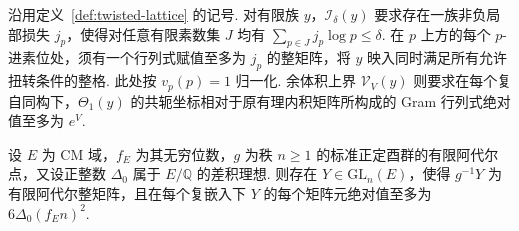 沿用定义~\ref{def:twisted-lattice} 的记号. 对有限族 $y$，$\mathcal I_\delta(y)$ 要求存在一族非负局部损失 $j_p$，使得对任意有限素数集 $J$ 均有 $\sum_{p\in J}j_p\log p\le\delta$. 在 $p$ 上方的每个 $p$-进素位处，须有一个行列式赋值至多为 $j_p$ 的整矩阵，将 $y$ 映入同时满足所有允许扭转条件的整格. 此处按 $v_p(p)=1$ 归一化. 余体积上界 $\mathcal V_V(y)$ 则要求在每个复自同构下，$\Theta_1(y)$ 的共轭坐标相对于原有理内积矩阵所构成的 Gram 行列式绝对值至多为 $e^V$.

\begin{lemma}[正定酉格中的短基]
\label{lem:a-unitary-lattice-basis}
\emitthmsource
设 $E$ 为 CM 域，$f_E$ 为其无穷位数，$g$ 为秩 $n\ge1$ 的标准正定酉群的有限阿代尔点，又设正整数 $\Delta_0$ 属于 $E/\mathbb Q$ 的差积理想. 则存在 $Y\in\mathrm{GL}_n(E)$，使得 $g^{-1}Y$ 为有限阿代尔整矩阵，且在每个复嵌入下 $Y$ 的每个矩阵元绝对值至多为 $6\Delta_0(f_E n)^2$.
\end{lemma}
